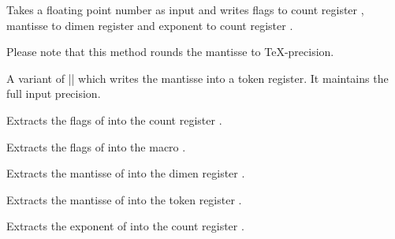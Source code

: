\begin{command}{}
	Takes a floating point number  as input and writes flags to count
	register , mantisse to dimen register  and exponent to count
	register .

	Please note that this method rounds the mantisse to \TeX-precision.
\end{command}

\begin{command}{}
	A variant of |\pgfmathfloattoregisters| which writes the mantisse into a token register. It maintains the full input precision.
\end{command}

\begin{command}{}
	Extracts the flags of  into the count register .
\end{command}

\begin{command}{}
	Extracts the flags of  into the macro .
\end{command}

\begin{command}{}
	Extracts the mantisse of  into the dimen register .
\end{command}
\begin{command}{}
	Extracts the mantisse of  into the token register .
\end{command}
\begin{command}{}
	Extracts the exponent of  into the count register .
\end{command}

